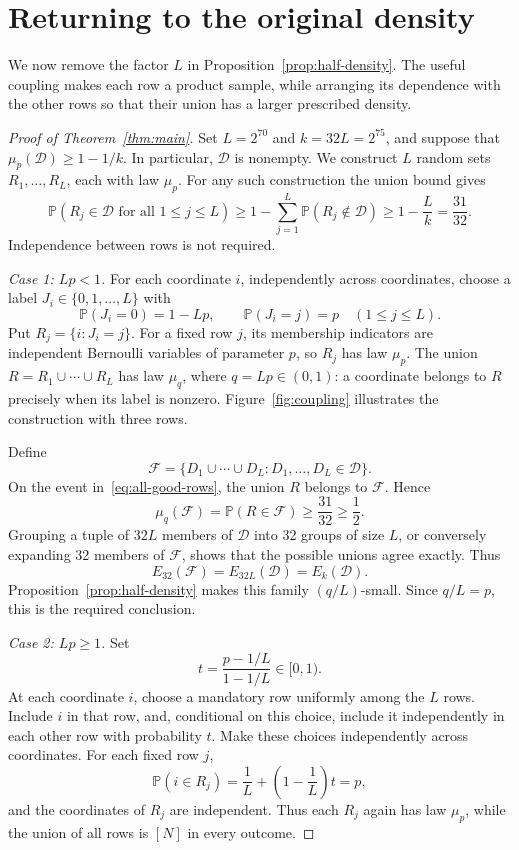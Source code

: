 \section{Returning to the original density}
\label{sec:density}

We now remove the factor $L$ in Proposition~\ref{prop:half-density}.
The useful coupling makes each row a product sample, while arranging
its dependence with the other rows so that their union has a larger
prescribed density.

\begin{proof}[Proof of Theorem~\ref{thm:main}]
Set $L=2^{70}$ and $k=32L=2^{75}$, and suppose that
$\mu_p(\mathcal D)\ge1-1/k$. In particular, $\mathcal D$ is nonempty.
We construct $L$ random sets $R_1,\ldots,R_L$, each with law $\mu_p$.
For any such construction the union bound gives
\begin{equation}
\label{eq:all-good-rows}
\mathbb P(R_j\in\mathcal D\text{ for all }1\le j\le L)
\ge1-\sum_{j=1}^L\mathbb P(R_j\notin\mathcal D)
\ge1-\frac Lk=\frac{31}{32}.
\end{equation}
Independence between rows is not required.

\medskip
\noindent\emph{Case 1: $Lp<1$.}
For each coordinate $i$, independently across coordinates, choose a label
$J_i\in\{0,1,\ldots,L\}$ with
\[
\mathbb P(J_i=0)=1-Lp,
\qquad
\mathbb P(J_i=j)=p\quad(1\le j\le L).
\]
Put $R_j=\{i:J_i=j\}$. For a fixed row $j$, its membership indicators
are independent Bernoulli variables of parameter $p$, so $R_j$ has law
$\mu_p$. The union $R=R_1\cup\cdots\cup R_L$ has law $\mu_q$,
where $q=Lp\in(0,1)$: a coordinate belongs to $R$ precisely when
its label is nonzero.
Figure~\ref{fig:coupling} illustrates the construction with three rows.



Define
\[
\mathcal F
=\{D_1\cup\cdots\cup D_L:D_1,\ldots,D_L\in\mathcal D\}.
\]
On the event in~\eqref{eq:all-good-rows}, the union $R$ belongs to
$\mathcal F$. Hence
\[
\mu_q(\mathcal F)=\mathbb P(R\in\mathcal F)
\ge\frac{31}{32}\ge\frac12.
\]
Grouping a tuple of $32L$ members of $\mathcal D$ into 32 groups of
size $L$, or conversely expanding 32 members of $\mathcal F$, shows that
the possible unions agree exactly. Thus
\[
E_{32}(\mathcal F)=E_{32L}(\mathcal D)=E_k(\mathcal D).
\]
Proposition~\ref{prop:half-density} makes this family $(q/L)$-small.
Since $q/L=p$, this is the required conclusion.

\medskip
\noindent\emph{Case 2: $Lp\ge1$.}
Set
\[
t=\frac{p-1/L}{1-1/L}\in[0,1).
\]
At each coordinate $i$, choose a mandatory row uniformly among the $L$
rows. Include $i$ in that row, and, conditional on this choice, include
it independently in each other row with probability $t$.
Make these choices independently across coordinates. For each fixed
row $j$,
\[
\mathbb P(i\in R_j)
=\frac1L+\left(1-\frac1L\right)t=p,
\]
and the coordinates of $R_j$ are independent. Thus each $R_j$ again has
law $\mu_p$, while the union of all rows is $[N]$ in every outcome.


\end{proof}
